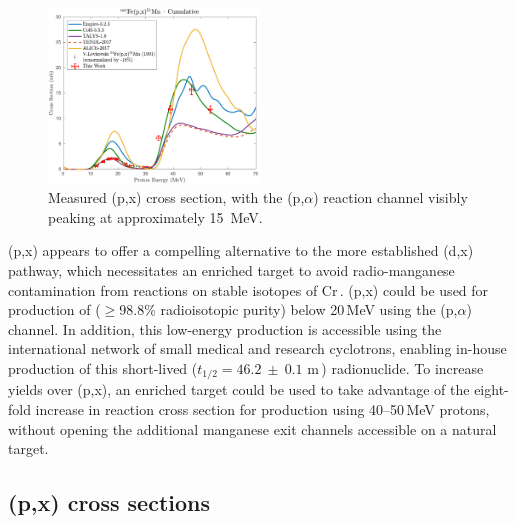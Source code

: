 \begin{figure}
 \centering
 \includegraphics[width=0.5\textwidth]{./figures/51Mn.pdf}
 \caption{Measured (p,x) cross section, with the (p,$\alpha$) reaction channel visibly peaking at approximately \mbox{15 MeV}.}
 \label{fig:51Mn}
\end{figure}

(p,x) appears to offer a compelling alternative to the more established (d,x) pathway, which necessitates an enriched  target to avoid radio-manganese contamination from reactions on stable isotopes of Cr\,\cite{Klein2000}.
(p,x) could be used for 
production of   ($\geq$98.8\% radioisotopic purity) below 20\,MeV using the (p,$\alpha$) channel.
In addition, this low-energy production is accessible using the international network of small medical and research cyclotrons, enabling in-house production of this short-lived ($t_{1/2}=46.2~\pm~0.1$ m\,\cite{Wang2017}) radionuclide.
To increase yields over (p,x), an enriched  target could be used to take advantage of the eight-fold increase in reaction cross section for production using 40--50\,MeV protons, without opening the additional manganese exit channels accessible on a natural target.









\subsection{(p,x) cross sections}



